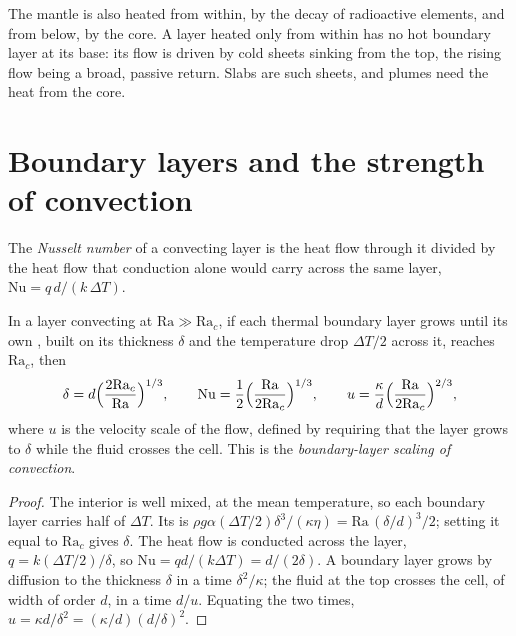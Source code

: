 The mantle is also heated from within, by the decay of radioactive elements,
and from below, by the core. A layer heated only from within has no hot
boundary layer at its base: its flow is driven by cold sheets sinking from the
top, the rising flow being a broad, passive return. Slabs are such sheets, and
plumes need the heat from the core.

\section{Boundary layers and the strength of convection}

\begin{definition}\label{def:b3:mantle-convection:nusselt}
The \emph{Nusselt number} of a convecting layer is the
heat flow through it divided by the heat flow that conduction alone would carry
across the same layer, $\mathrm{Nu} = q\,d/(k\,\Delta T)$.
\end{definition}

\begin{theorem}\label{thm:b3:mantle-convection:scaling}
In a layer convecting at $\mathrm{Ra} \gg \mathrm{Ra}_c$, if each thermal
boundary layer grows until its own , built on its thickness
$\delta$ and the temperature drop $\Delta T/2$ across it, reaches
$\mathrm{Ra}_c$, then
\[
  \delta = d\Bigl(\frac{2\mathrm{Ra}_c}{\mathrm{Ra}}\Bigr)^{1/3},\qquad
  \mathrm{Nu} = \frac12\Bigl(\frac{\mathrm{Ra}}{2\mathrm{Ra}_c}\Bigr)^{1/3},
  \qquad
  u = \frac\kappa d\Bigl(\frac{\mathrm{Ra}}{2\mathrm{Ra}_c}\Bigr)^{2/3},
\]
where $u$ is the velocity scale of the flow, defined by requiring that the
layer grows to $\delta$ while the fluid crosses the cell. This is the
\emph{boundary-layer scaling of convection}.
\end{theorem}

\begin{proof}
The interior is well mixed, at the mean temperature, so each boundary layer
carries half of $\Delta T$. Its  is $\rho g\alpha(\Delta T/2)
\delta^3/(\kappa\eta) = \mathrm{Ra}\,(\delta/d)^3/2$; setting it equal to
$\mathrm{Ra}_c$ gives $\delta$. The heat flow is conducted across the layer,
$q = k(\Delta T/2)/\delta$, so $\mathrm{Nu} = qd/(k\Delta T) = d/(2\delta)$.
A boundary layer grows by diffusion to the thickness $\delta$ in a time
$\delta^2/\kappa$; the fluid at the top crosses the cell, of width of order
$d$, in a time $d/u$. Equating the two times, $u = \kappa d/\delta^2 =
(\kappa/d)(d/\delta)^2$.
\end{proof}

